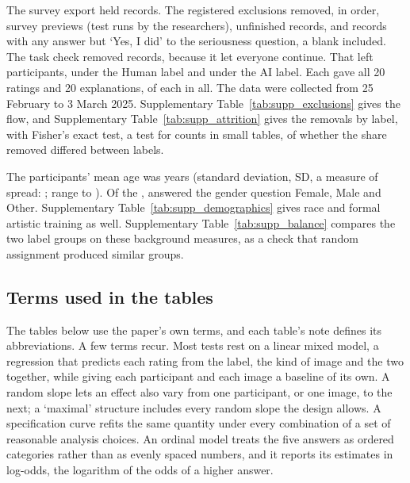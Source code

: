 The survey export held \SOneNRecords{} records. The registered exclusions removed, in order, \SOneNPreviewRemoved{} survey previews (test runs by the researchers), \SOneNUnfinishedRemoved{} unfinished records, and \SOneNNotSeriousRemoved{} records with any answer but `Yes, I did' to the seriousness question, a blank included. The task check removed \SOneNAttentionRemoved{} records, because it let everyone continue. That left \SOneN{} participants, \SOneNHuman{} under the Human label and \SOneNAI{} under the AI label. Each gave all 20 ratings and 20 explanations, \SOneNRatings{} of each in all. The data were collected from 25 February to 3 March 2025. Supplementary Table~\ref{tab:supp_exclusions} gives the flow, and Supplementary Table~\ref{tab:supp_attrition} gives the removals by label, with Fisher's exact test, a test for counts in small tables, of whether the share removed differed between labels.

The participants' mean age was \SOneAgeMean{} years (standard deviation, SD, a measure of spread: \SOneAgeSD; range \SOneAgeMin{} to \SOneAgeMax). Of the \SOneN, \SOneNWomen{} answered the gender question Female, \SOneNMen{} Male and \SOneNGenderOther{} Other. Supplementary Table~\ref{tab:supp_demographics} gives race and formal artistic training as well. Supplementary Table~\ref{tab:supp_balance} compares the two label groups on these background measures, as a check that random assignment produced similar groups.






\subsection*{Terms used in the tables}

The tables below use the paper's own terms, and each table's note defines its abbreviations. A few terms recur. Most tests rest on a linear mixed model, a regression that predicts each rating from the label, the kind of image and the two together, while giving each participant and each image a baseline of its own. A random slope lets an effect also vary from one participant, or one image, to the next; a `maximal' structure includes every random slope the design allows. A specification curve refits the same quantity under every combination of a set of reasonable analysis choices. An ordinal model treats the five answers as ordered categories rather than as evenly spaced numbers, and it reports its estimates in log-odds, the logarithm of the odds of a higher answer.

